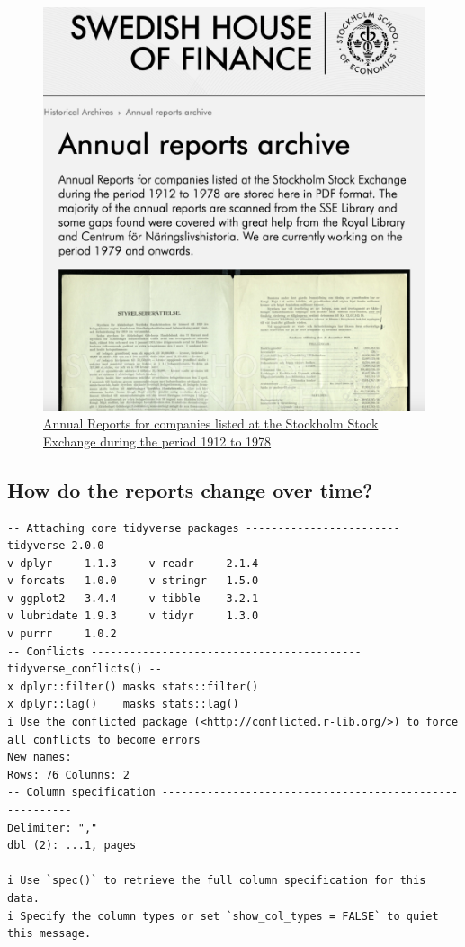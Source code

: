 \documentclass[
  letterpaper,
  DIV=11,
  numbers=noendperiod]{scrartcl}
\begin{document}
\begin{figure}

{\centering \includegraphics{assets/source_material.png}

}

\caption{\href{https://www.hhs.se/en/houseoffinance/data-center/historical-archives/annual-reports-archive/}{Annual
Reports for companies listed at the Stockholm Stock Exchange during the
period 1912 to 1978}}

\end{figure}

\hypertarget{how-do-the-reports-change-over-time}{%
\subsection{How do the reports change over
time?}\label{how-do-the-reports-change-over-time}}

\begin{verbatim}
-- Attaching core tidyverse packages ------------------------ tidyverse 2.0.0 --
v dplyr     1.1.3     v readr     2.1.4
v forcats   1.0.0     v stringr   1.5.0
v ggplot2   3.4.4     v tibble    3.2.1
v lubridate 1.9.3     v tidyr     1.3.0
v purrr     1.0.2     
-- Conflicts ------------------------------------------ tidyverse_conflicts() --
x dplyr::filter() masks stats::filter()
x dplyr::lag()    masks stats::lag()
i Use the conflicted package (<http://conflicted.r-lib.org/>) to force all conflicts to become errors
New names:
Rows: 76 Columns: 2
-- Column specification --------------------------------------------------------
Delimiter: ","
dbl (2): ...1, pages

i Use `spec()` to retrieve the full column specification for this data.
i Specify the column types or set `show_col_types = FALSE` to quiet this message.
\end{verbatim}
\end{document}
